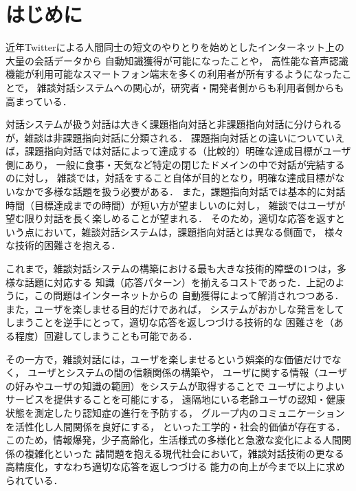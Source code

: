 \documentclass[japanese]{jnlp_1.4}
\begin{document}
\maketitle

\section{はじめに}

近年Twitterによる人間同士の短文のやりとりを始めとしたインターネット上の大量の会話データから
自動知識獲得\cite{Inaba2014}が可能になったことや，
高性能な音声認識機能が利用可能なスマートフォン端末を多くの利用者が所有するようになったことで，
雑談対話システムへの関心が，研究者・開発者側からも利用者側からも高まっている．

対話システムが扱う対話は大きく課題指向対話と非課題指向対話に分けられるが，雑談は非課題指向対話に分類される．
課題指向対話との違いについていえば，課題指向対話では対話によって達成する（比較的）明確な達成目標がユーザ側にあり，
一般に食事・天気など特定の閉じたドメインの中で対話が完結するのに対し，
雑談では，対話をすること自体が目的となり，明確な達成目標がないなかで多様な話題を扱う必要がある．
また，課題指向対話では基本的に対話時間（目標達成までの時間）が短い方が望ましいのに対し，
雑談ではユーザが望む限り対話を長く楽しめることが望まれる．
そのため，適切な応答を返すという点において，雑談対話システムは，課題指向対話とは異なる側面で，
様々な技術的困難さを抱える．

これまで，雑談対話システムの構築における最も大きな技術的障壁の1つは，多様な話題に対応する
知識（応答パターン）を揃えるコストであった．上記のように，この問題はインターネットからの
自動獲得によって解消されつつある．また，ユーザを楽しませる目的\cite{Wallace2004,Banchs2012,Wilcock2013}だけであれば，
システムがおかしな発言をしてしまうことを逆手にとって，適切な応答を返しつづける技術的な
困難さを（ある程度）回避してしまうことも可能である．

その一方で，雑談対話には，ユーザを楽しませるという娯楽的な価値だけでなく，
ユーザとシステムの間の信頼関係の構築\cite{Bickmore2001}や，
ユーザに関する情報（ユーザの好みやユーザの知識の範囲）をシステムが取得することで
ユーザによりよいサービスを提供することを可能にする\cite{bang2015}，
遠隔地にいる老齢ユーザの認知・健康状態を測定したり認知症の進行を予防する\cite{Kobayashi2011}，
グループ内のコミュニケーションを活性化し人間関係を良好にする\cite{Matsuyama2013}，
といった工学的・社会的価値が存在する．
このため，情報爆発，少子高齢化，生活様式の多様化と急激な変化による人間関係の複雑化といった
諸問題を抱える現代社会において，雑談対話技術の更なる高精度化，すなわち適切な応答を返しつづける
能力の向上が今まで以上に求められている．
\end{document}
